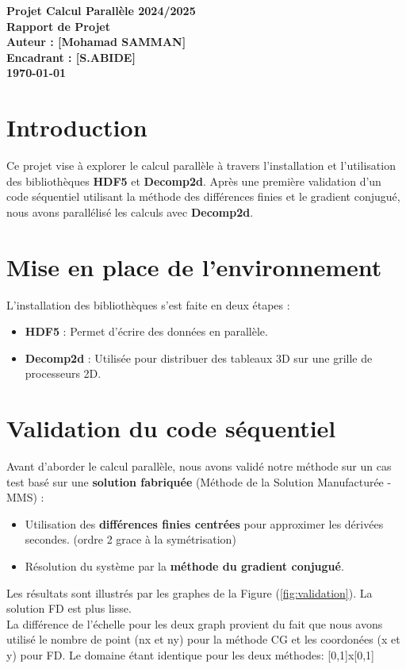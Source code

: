 \documentclass[a4paper,12pt]{article}
\begin{document}
\begin{center}
    {\LARGE \textbf{Projet Calcul Parallèle 2024/2025}} \\
    \vspace{0.5cm}
    {\Large \textbf{Rapport de Projet}} \\
    \vspace{1cm}
    \textbf{Auteur : [Mohamad SAMMAN]} \\
    \textbf{Encadrant : [S.ABIDE]} \\
    \vspace{1cm}
    \textbf{\today}
\end{center}

\section{Introduction}
Ce projet vise à explorer le calcul parallèle à travers l’installation et l’utilisation des bibliothèques \textbf{HDF5} et \textbf{Decomp2d}. Après une première validation d’un code séquentiel utilisant la méthode des différences finies et le gradient conjugué, nous avons parallélisé les calculs avec \textbf{Decomp2d}. 

\section{Mise en place de l’environnement}
L’installation des bibliothèques s’est faite en deux étapes :
\begin{itemize}
    \item \textbf{HDF5} : Permet d’écrire des données en parallèle.
    \item \textbf{Decomp2d} : Utilisée pour distribuer des tableaux 3D sur une grille de processeurs 2D.
\end{itemize}


\section{Validation du code séquentiel}
Avant d’aborder le calcul parallèle, nous avons validé notre méthode sur un cas test basé sur une \textbf{solution fabriquée} (Méthode de la Solution Manufacturée - MMS) :
\begin{itemize}
    \item Utilisation des \textbf{différences finies centrées} pour approximer les dérivées secondes. (ordre 2 grace à la symétrisation)
    \item Résolution du système par la \textbf{méthode du gradient conjugué}.
\end{itemize}
Les résultats sont illustrés par les graphes de la Figure (\ref{fig:validation}). La solution FD est plus lisse.\\
La différence de l'échelle pour les deux graph provient du fait que nous avons utilisé le nombre de point (nx et ny) pour la méthode CG et les coordonées (x et y) pour FD. Le domaine étant identique pour les deux méthodes: [0,1]x[0,1]
\end{document}
